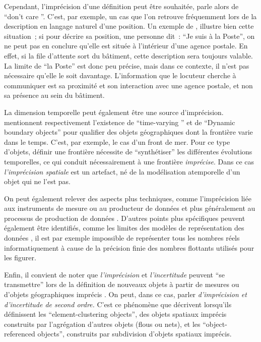 Cependant, l’imprécision d’une définition peut être souhaitée,
\textcite{Hadzilacos1996} parle alors de \enquote{don't care
  }. C’est, par exemple, un cas que l’on retrouve
fréquemment lors de la description en langage naturel d’une
position. Un exemple de \textcite{Bateman2010}, illustre bien cette
situation ; si pour décrire sa position, une personne dit :
\enquote{Je suis à la Poste}, on ne peut pas en conclure qu’elle est
située à l’intérieur d’une agence postale. En effet, si la file
d’attente sort du bâtiment, cette description sera toujours
valable. La limite de \enquote{la Poste} est donc peu précise, mais
dans ce contexte, il n’est pas nécessaire qu’elle le soit
davantage. L’information que le locuteur cherche à communiquer est sa
proximité et son interaction avec une agence postale, et non sa
présence au sein du bâtiment.

La dimension temporelle peut également être une source
d’imprécision. \textcite{Hadzilacos1996,Liu2019} mentionnent
respectivement l’existence de \enquote{time-varying
  } et de \enquote{Dynamic boundary objects} pour
qualifier des objets géographiques dont la frontière varie dans le
temps. C’est, par exemple, le cas d’un front de mer. Pour ce type
d’objets, définir une frontière nécessite de \enquote{synthétiser} les
différentes évolutions temporelles, ce qui conduit nécessairement à
une frontière \emph{imprécise}. Dans ce cas \emph{l’imprécision
  spatiale} est un artefact, né de la modélisation atemporelle d’un
objet qui ne l’est pas.

On peut également relever des aspects plus techniques, comme
l’imprécision liée aux instruments de mesure ou au producteur de
données \autocite{Follin2019} et plus généralement au processus de
production de données
\autocite{Dutton1992,Evans2008,Follin2019}. D’autres points plus
spécifiques peuvent également être identifiés, comme les limites des
modèles de représentation des données
\autocite{Dutton1992,Follin2019}, il est par exemple impossible de
représenter tous les nombres réels informatiquement à cause de la
précision finie des nombres flottants utilisés pour les figurer.

Enfin, il convient de noter que \emph{l’imprécision} et
\emph{l’incertitude} peuvent \enquote{se transmettre} lors de la
définition de nouveaux objets à partir de mesures
\autocite{Dutton1992} ou d’objets géographiques imprécis
\autocite{Liu2019,Follin2019}. On peut, dans ce cas, parler
\emph{d’imprécision \emph{et} d’incertitude de second ordre.} C’est ce
phénomène que décrivent \textcite{Liu2019} lorsqu’ils définissent les
\enquote{element-clustering objects}, des objets spatiaux imprécis
construits par l’agrégation d’autres objets (flous ou nets), et les
\enquote{object-referenced objects}, construits par subdivision
d’objets spatiaux imprécis.

